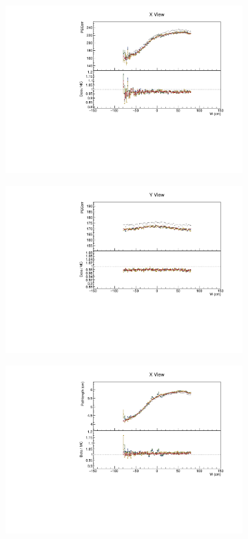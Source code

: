\documentclass[12pt,a4paper]{article}
\begin{document}
\begin{figure}[h!]
\begin{subfigure}{0.5\textwidth}
  \end{subfigure}
  \begin{subfigure}{0.5\textwidth}
    \includegraphics[width=\linewidth]{essentialsec_tb/pecorr_w_x.pdf}
  \end{subfigure}
  \begin{subfigure}{0.5\textwidth}
    \includegraphics[width=\linewidth]{essentialsec_tb/pecorr_w_y.pdf}
  \end{subfigure}
  \begin{subfigure}{0.5\textwidth}
    \includegraphics[width=\linewidth]{essentialsec_tb/cm_w_x.pdf}

\end{subfigure}
\end{figure}
\end{document}
